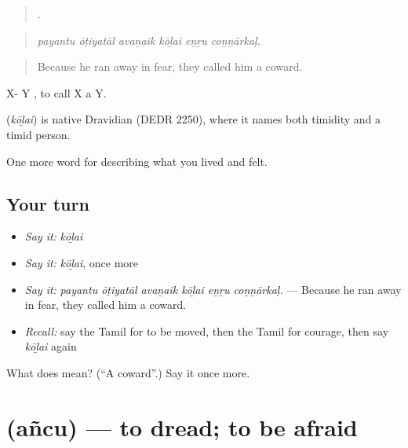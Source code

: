 \begin{quote}
     .
\end{quote}

\begin{quote}
\emph{payantu ōṭiyatāl avaṉaik kōḻai eṉṟu coṉṉārkaḷ.}
\end{quote}

\begin{quote}
Because he ran away in fear, they called him a coward.
\end{quote}

X- Y  , to call X a Y.

\begin{cousinweb}
\textbf{} (\emph{kōḻai}) is native Dravidian (DEDR 2250), where it names both timidity and a timid person.
\end{cousinweb}

\begin{grammarlens}[title={What you've built}]
One more word for describing what you lived and felt.
\end{grammarlens}

\subsection*{Your turn}
\begin{itemize}
\raggedright
  \item \emph{Say it:} \emph{kōḻai}
  \item \emph{Say it:} \emph{kōḻai}, once more
  \item \emph{Say it:} \emph{payantu ōṭiyatāl avaṉaik kōḻai eṉṟu coṉṉārkaḷ.} — Because he ran away in fear, they called him a coward.
  \item \emph{Recall:} say the Tamil for to be moved, then the Tamil for courage, then say \emph{kōḻai} again
\end{itemize}

\begin{tcolorbox}[breakable,colback=teal!4,colframe=teal!35!black,title={Before you move on}]
What does  mean? (\textquotedblleft{}A coward\textquotedblright{}.) Say it once more.
\end{tcolorbox}
\section[\texorpdfstring{\ta{அஞ்சு} (añcu)}{அஞ்சு (añcu)}]{ (añcu) — to dread; to be afraid}

